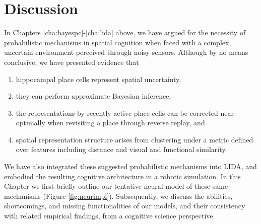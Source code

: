 \chapter{Discussion}
\label{cha:discussion}

In Chapters \ref{cha:bayespc}-\ref{cha:lida} above, we have argued for the necessity of probabilistic mechanisms in spatial cognition when faced with a complex, uncertain environment perceived through noisy sensors. Although by no means conclusive, we have presented evidence that

\begin{enumerate}
	\item hippocampal place cells represent spatial uncertainty, 
	\item they can perform approximate Bayesian inference,
	\item the representations by recently active place cells can be corrected near-optimally when revisiting a place through reverse replay, and
	\item spatial representation structure arises from clustering under a metric defined over features including distance and visual and functional similarity.
\end{enumerate}

We have also integrated these suggested probabilistic mechanisms into LIDA, and embodied the resulting cognitive architecture in a robotic simulation. In this Chapter we first briefly outline our tentative neural model of these same mechanisms (Figure \ref{fig:neurimpl}). Subsequently, we discuss the abilities, shortcomings, and missing functionalities of our models, and their consistency with related empirical findings, from a cognitive science perspective. 

\nocite{deshmukh2013}

